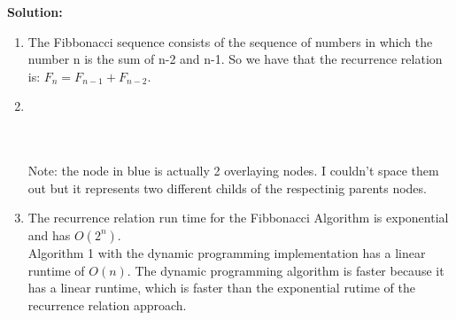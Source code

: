 \documentclass[9pt]{article}
\begin{document}
 \pagebreak
 \phantom{Test}
 \textbf{Solution:}   \\
\begin{enumerate}
  \item The Fibbonacci sequence consists of the sequence of numbers in which the number n is the sum of n-2 and n-1. So 
  we have that the recurrence relation is: $F_n = F_{n-1} + F_{n-2}$.
  \item \phantom{.}\\
   \\\\
  Note: the node in blue is actually 2 overlaying nodes. I couldn't space them out but it represents two different childs of the respectinig parents nodes.

  \item The recurrence relation run time for the Fibbonacci Algorithm is exponential and has $O(2^n)$.
  \\ Algorithm 1 with the dynamic programming implementation has a linear runtime of $O(n)$.
  The dynamic programming algorithm is faster because it has a linear runtime, which is faster than the exponential rutime of the recurrence relation approach.


\end{enumerate}

\fi

\newpage

\phantom{Test}
\end{document}
